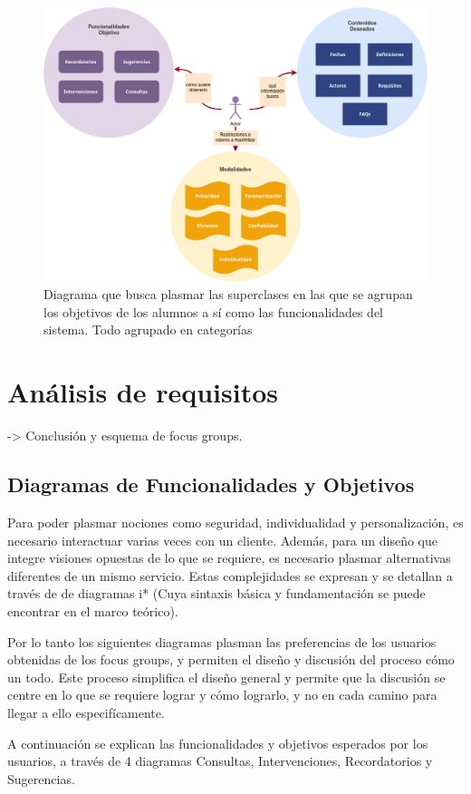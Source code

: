     \begin{figure}[h!]
        \centering
        \includegraphics[scale=0.4]{media/imagenes/focus_groups/objetivos_y_cualidades.png}
        \caption{Diagrama que busca plasmar las superclases en las que se agrupan los objetivos de los alumnos a sí como las funcionalidades del sistema. Todo agrupado en categorías}
        \label{fig:my_label}
    \end{figure}

\section{Análisis de requisitos}
    \par -> Conclusión y esquema de focus groups.
    \subsection{Diagramas de Funcionalidades y Objetivos}
        \par Para poder plasmar nociones como seguridad, individualidad y personalización, es necesario interactuar varias veces con un cliente. Además, para un diseño que integre visiones opuestas de lo que se requiere, es necesario plasmar alternativas diferentes de un mismo servicio. Estas complejidades se expresan y se detallan a través de de diagramas i* (Cuya sintaxis básica y fundamentación se puede encontrar en el marco teórico).
        \par Por lo tanto los siguientes diagramas plasman las preferencias de los usuarios obtenidas de los focus groups, y permiten el diseño y discusión del proceso cómo un todo. Este proceso simplifica el diseño general y permite que la discusión se centre en lo que se requiere lograr y cómo lograrlo, y no en cada camino para llegar a ello especifícamente.
        \par A continuación se explican las funcionalidades y objetivos esperados por los usuarios, a través de 4 diagramas Consultas, Intervenciones, Recordatorios y Sugerencias.

